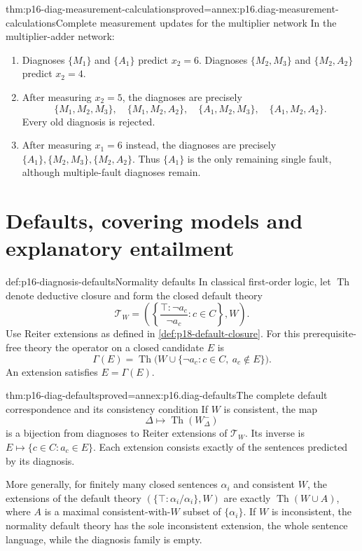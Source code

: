 \begin{hbtheorem}{thm:p16-diag-measurement-calculations}{proved=annex:p16.diag-measurement-calculations}{Complete measurement updates for the multiplier network}
In the multiplier-adder network:
\begin{enumerate}
\item Diagnoses \(\{M_1\}\) and \(\{A_1\}\) predict \(x_2=6\).
      Diagnoses \(\{M_2,M_3\}\) and \(\{M_2,A_2\}\)
      predict \(x_2=4\).
\item After measuring \(x_2=5\), the diagnoses are precisely
 \[
 \{M_1,M_2,M_3\},\quad\{M_1,M_2,A_2\},\quad
 \{A_1,M_2,M_3\},\quad\{A_1,M_2,A_2\}.
 \]
      Every old diagnosis is rejected.
\item After measuring \(x_1=6\) instead, the diagnoses are
      precisely \(\{A_1\},\{M_2,M_3\},\{M_2,A_2\}\).
      Thus \(\{A_1\}\) is the only remaining single fault,
      although multiple-fault diagnoses remain.
\end{enumerate}
\end{hbtheorem}

\section{Defaults, covering models and explanatory entailment}
\label{sec:p16-diagnosis-defaults}

\begin{hbdefinition}{def:p16-diagnosis-defaults}{Normality defaults}
In classical first-order logic, let \(\operatorname{Th}\)
denote deductive closure and form the closed default theory
\[
       \mathcal T_W=
       \left(\left\{\frac{\top:\neg a_c}{\neg a_c}:c\in C\right\},W\right).
\]
Use Reiter extensions as defined in
\cref{def:p18-default-closure}. For this prerequisite-free
theory the operator on a closed candidate \(E\) is
\[
 \Gamma(E)=\operatorname{Th}
       \bigl(W\cup\{\neg a_c:c\in C,\ a_c\notin E\}\bigr).
\]
An extension satisfies \(E=\Gamma(E)\).
\end{hbdefinition}

\begin{hbtheorem}{thm:p16-diag-defaults}{proved=annex:p16.diag-defaults}{The complete default correspondence and its consistency condition}
If \(W\) is consistent, the map
\[
       \Delta\longmapsto\operatorname{Th}(W^-_\Delta)
\]
is a bijection from diagnoses to Reiter extensions of
\(\mathcal T_W\). Its inverse is
\(E\mapsto\{c\in C:a_c\in E\}\). Each extension consists
exactly of the sentences predicted by its diagnosis.

More generally, for finitely many closed sentences
\(\alpha_i\) and consistent \(W\), the extensions of
the default theory \((\{\top:\alpha_i/\alpha_i\},W)\) are exactly
\(\operatorname{Th}(W\cup A)\), where \(A\) is a maximal
consistent-with-\(W\) subset of \(\{\alpha_i\}\).
If \(W\) is inconsistent, the normality default theory
has the sole inconsistent extension, the whole sentence
language, while the diagnosis family is empty.
\end{hbtheorem}

